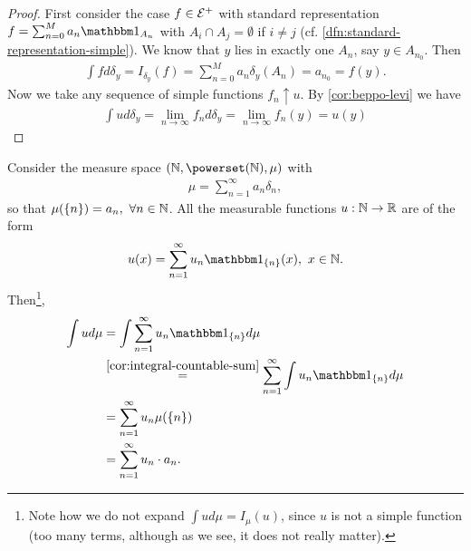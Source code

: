 \begin{proof}
	First consider the case $f \in \mathcal{E}^+$ with standard representation $f = \sum_{n = 0}^M a_n \ind_{A_n}$ with $A_i \cap A_j = \emptyset$ if $i \neq j$ (cf. \autoref{dfn:standard-representation-simple}). We know that $y$ lies in exactly one $A_n$, say $y \in A_{n_0}$. Then
	\begin{align*}
		\int f d\delta_y
		= I_{\delta_y}(f)
		= \sum_{n=0}^M a_n \delta_y(A_n)
		= a_{n_0} = f(y).
	\end{align*}
	Now we take any sequence of simple functions $f_n \uparrow u$. By \autoref{cor:beppo-levi} we have
	\begin{align*}
		\int u d\delta_y = \lim_{n\to\infty} f_n d\delta_y = \lim_{n\to\infty} f_n(y) = u(y)
	\end{align*}
\end{proof}

\begin{eg}
	Consider the measure space $(\N, \powerset(\N), \mu)$ with
	\begin{align*}
		\mu = \sum_{n=1}^\infty a_n \delta_n,
	\end{align*}
	so that $\mu(\{n\}) = a_n,\ \forall n \in \mathbb{N}$.
	All the measurable functions $u : \mathbb{N}\to \mathbb{R}$ are of the form
	\begin{align*}
		u(x) = \sum_{n=1}^{\infty}u_n \ind_{\{n\}}(x),\ x \in \N.
	\end{align*}
	Then\footnote{Note how we do not expand $\int u d\mu = I_\mu(u)$, since $u$ is not a simple function (too many terms, although as we see, it does not really matter).},
	\begin{align*}
		\int u d\mu
		&= \int \sum_{n = 1}^\infty u_n \ind_{\{n\}}d\mu\\
		&\overset{\ref{cor:integral-countable-sum}}{=} \sum_{n = 1}^\infty \int u_n \ind_{\{n\}}d\mu\\
		&= \sum_{n = 1}^\infty u_n \mu(\{n\})\\
		&= \sum_{n = 1}^\infty u_n \cdot a_n.
	\end{align*}
\end{eg}